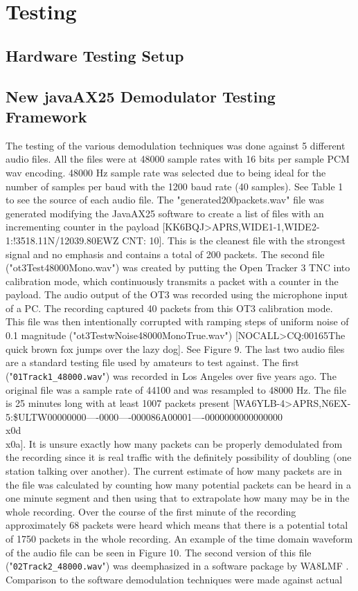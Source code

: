 \chapter{Testing}

\section{Hardware Testing Setup}

\section{New javaAX25 Demodulator Testing Framework}


The testing of the various demodulation techniques was done against 5 different audio files. All the files were at 48000 sample rates with 16 bits per sample PCM wav encoding. 48000 Hz sample rate was selected due to being ideal for the number of samples per baud with the 1200 baud rate (40 samples). See Table 1 to see the source of each audio file. The "generated200packets.wav" file was generated modifying the JavaAX25 software to create a list of files with an incrementing counter in the payload [KK6BQJ>APRS,WIDE1-1,WIDE2-1:!3518.11N/12039.80EWZ CNT: 10]. This is the cleanest file with the strongest signal and no emphasis and contains a total of 200 packets. The second file ("ot3Test48000Mono.wav") was created by putting the Open Tracker 3 TNC into calibration mode, which continuously transmits a packet with a counter in the payload. The audio output of the OT3 was recorded using the microphone input of a PC. The recording captured 40 packets from this OT3 calibration mode. This file was then intentionally corrupted with ramping steps of uniform noise of 0.1 magnitude ("ot3TestwNoise48000MonoTrue.wav") [NOCALL>CQ:00165The quick brown fox jumps over the lazy dog]. See Figure 9.  The last two audio files are a standard testing file used by amateurs to test against. The first ("\verb|01Track1_48000.wav|") was recorded in Los Angeles over five years ago. The original file was a sample rate of 44100 and was resampled to 48000 Hz. The file is 25 minutes long with at least 1007 packets present [WA6YLB-4>APRS,N6EX-5:\$ULTW00000000----0000----000086A00001----0000000000000000\\x0d\\x0a]. It is unsure exactly how many packets can be properly demodulated from the recording since it is real traffic with the definitely possibility of doubling (one station talking over another). The current estimate of how many packets are in the file was calculated by counting how many potential packets can be heard in a one minute segment and then using that to extrapolate how many may be in the whole recording. Over the course of the first minute of the recording approximately 68 packets were heard which means that there is a potential total of 1750 packets in the whole recording. An example of the time domain waveform of the audio file can be seen in Figure 10. The second version of this file ("\verb|02Track2_48000.wav|") was deemphasized in a software package by WA8LMF \cite{Smith2009}. Comparison to the software demodulation techniques were made against actual 